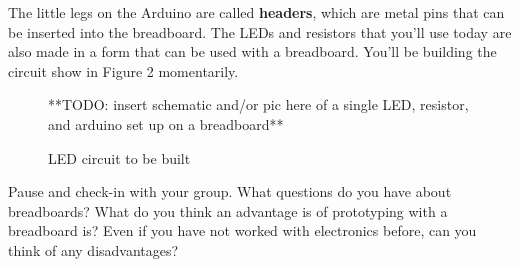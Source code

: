 \documentclass[12pt]{article}
\begin{document}
    The little legs on the Arduino are called \textbf{headers}, which are metal pins that can be inserted into the breadboard. The LEDs and resistors that you’ll use today are also made in a form that can be used with a breadboard. You'll be building the circuit show in Figure 2 momentarily. \newline
    	
    \begin{figure}[h!]
    	   **TODO: insert schematic and/or pic here of a single LED, resistor, and arduino set up on a breadboard**
    	   \caption{LED circuit to be built}
    \end{figure}
    	
    Pause and check-in with your group. What questions do you have about breadboards? What do you think an advantage is of prototyping with a breadboard is? Even if you have not worked with electronics before, can you think of any disadvantages?
    	
\end{document}
